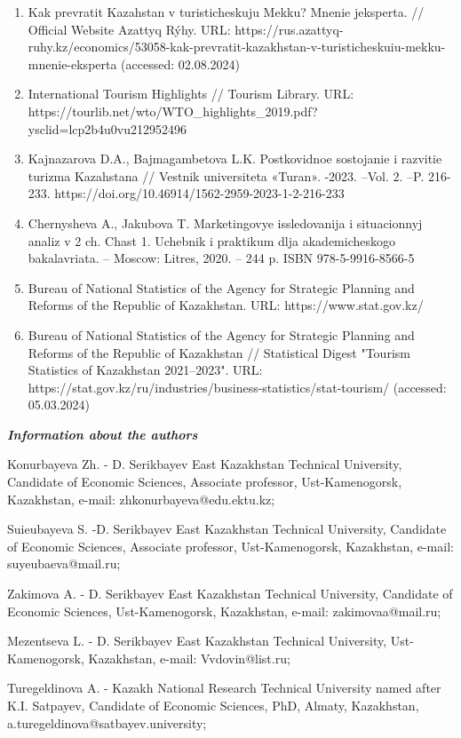 \begin{enumerate}
  (accessed: 02.08.2024)
\item
  Kak prevratit\textquotesingle{} Kazahstan v turisticheskuju Mekku?
  Mnenie jeksperta. // Official Website Azattyq Rýhy. URL:
  https://rus.azattyq-ruhy.kz/economics/53058-kak-prevratit-kazakhstan-v-turisticheskuiu-mekku-mnenie-eksperta
  (accessed: 02.08.2024)
\item
  International Tourism Highlights // Tourism Library. URL:
  https://tourlib.net/wto/WTO\_highlights\_2019.pdf?ysclid=lcp2b4u0vu212952496
\item
  Kajnazarova D.A., Bajmagambetova L.K. Postkovidnoe sostojanie i
  razvitie turizma Kazahstana // Vestnik universiteta «Turan». -2023.
  --Vol. 2. --P. 216-233.
  https://doi.org/10.46914/1562-2959-2023-1-2-216-233
\item
  Chernysheva A., Jakubova T. Marketingovye issledovanija i situacionnyj
  analiz v 2 ch. Chast\textquotesingle{} 1. Uchebnik i praktikum dlja
  akademicheskogo bakalavriata. -- Moscow: Litres, 2020. -- 244 p. ISBN
  978-5-9916-8566-5
\item
  Bureau of National Statistics of the Agency for Strategic Planning and
  Reforms of the Republic of Kazakhstan. URL: https://www.stat.gov.kz/
\item
  Bureau of National Statistics of the Agency for Strategic Planning and
  Reforms of the Republic of Kazakhstan // Statistical Digest "Tourism
  Statistics of Kazakhstan 2021--2023". URL:
  https://stat.gov.kz/ru/industries/business-statistics/stat-tourism/
  (accessed: 05.03.2024)
\end{enumerate}

\emph{{\bfseries Information about the authors}}

Konurbayeva Zh. - D. Serikbayev East Kazakhstan Technical University,
Candidate of Economic Sciences, Associate professor, Ust-Kamenogorsk,
Kazakhstan, e-mail: zhkonurbayeva@edu.ektu.kz;

Suieubayeva S. -D. Serikbayev East Kazakhstan Technical University,
Candidate of Economic Sciences, Associate professor, Ust-Kamenogorsk,
Kazakhstan, e-mail: suyeubaeva@mail.ru;

Zakimova A. - D. Serikbayev East Kazakhstan Technical University,
Candidate of Economic Sciences, Ust-Kamenogorsk, Kazakhstan, e-mail:
zakimovaa@mail.ru;

Mezentseva L. - D. Serikbayev East Kazakhstan Technical University,
Ust-Kamenogorsk, Kazakhstan, e-mail: Vvdovin@list.ru;

Turegeldinova A. - Kazakh National Research Technical University named
after K.I. Satpayev, Candidate of Economic Sciences, PhD, Almaty,
Kazakhstan, a.turegeldinova@satbayev.university;

